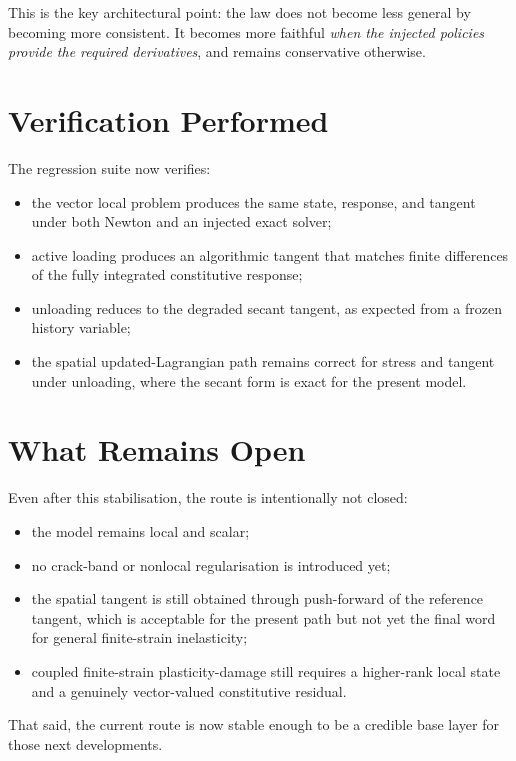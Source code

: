 This is the key architectural point: the law does not become less general by
becoming more consistent.  It becomes more faithful \emph{when the injected
policies provide the required derivatives}, and remains conservative otherwise.

\section{Verification Performed}

The regression suite now verifies:
\begin{itemize}
  \item the vector local problem produces the same state, response, and
        tangent under both Newton and an injected exact solver;
  \item active loading produces an algorithmic tangent that matches finite
        differences of the fully integrated constitutive response;
  \item unloading reduces to the degraded secant tangent, as expected from a
        frozen history variable;
  \item the spatial updated-Lagrangian path remains correct for stress and
        tangent under unloading, where the secant form is exact for the
        present model.
\end{itemize}

\section{What Remains Open}

Even after this stabilisation, the route is intentionally not closed:
\begin{itemize}
  \item the model remains local and scalar;
  \item no crack-band or nonlocal regularisation is introduced yet;
  \item the spatial tangent is still obtained through push-forward of the
        reference tangent, which is acceptable for the present path but not yet
        the final word for general finite-strain inelasticity;
  \item coupled finite-strain plasticity-damage still requires a higher-rank
        local state and a genuinely vector-valued constitutive residual.
\end{itemize}

That said, the current route is now stable enough to be a credible base layer
for those next developments.


